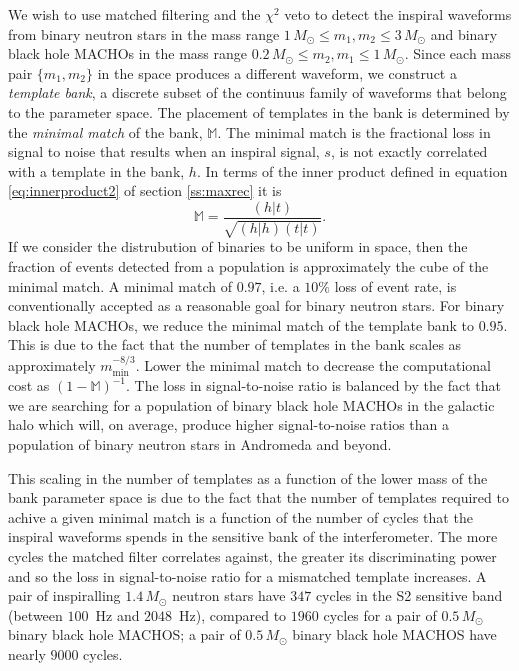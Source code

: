We wish to use matched filtering and the $\chi^2$ veto to detect the inspiral
waveforms from binary neutron stars in the mass range $1\,M_\odot\le m_1,
m_2\le 3\,M_\odot$ and binary black hole MACHOs in the mass range
$0.2\,M_\odot\le m_2, m_1\le 1\,M_\odot$. Since each mass pair $\{m_1,m_2\}$
in the space produces a different waveform, we construct a {\em template
bank}, a discrete subset of the continuus family of waveforms that belong to
the parameter space. The placement of templates in the bank is determined by
the \emph{minimal match} of the bank, $\mathbb{M}$. The minimal match is the
fractional loss in signal to noise that results when an inspiral signal, $s$,
is not exactly correlated with a template in the bank, $h$. In terms of the
inner product defined in equation \ref{eq:innerproduct2} of section
\ref{ss:maxrec} it is
\begin{equation}
\mathbb{M} = \frac{(h|t)} {\sqrt{(h|h)(t|t)}}.
\end{equation}
If we consider the distrubution of binaries to be uniform in space, then the
fraction of events detected from a population is approximately the cube of the
minimal match. A minimal match of $0.97$, i.e. a $10\%$ loss of event rate, is
conventionally accepted as a reasonable goal for binary neutron stars. For
binary black hole MACHOs, we reduce the minimal match of the template bank to
$0.95$. This is due to the fact that the number of templates in the bank
scales as approximately $m_\mathrm{min}^{-8/3}$. Lower the minimal match to
decrease the computational cost as $(1 - \mathbb{M})^{-1}$. The
loss in signal-to-noise ratio is balanced by the fact that we are searching
for a population of binary black hole MACHOs in the galactic halo which will,
on average, produce higher signal-to-noise ratios than a population of binary
neutron stars in Andromeda and beyond.

This scaling in the number of templates as a function of the lower mass of the
bank parameter space is due to the fact that the number of templates required
to achive a given minimal match is a function of the number of cycles that the
inspiral waveforms spends in the sensitive bank of the interferometer. The
more cycles the matched filter correlates against, the greater its
discriminating power and so the loss in signal-to-noise ratio for a mismatched
template increases. A pair of inspiralling $1.4\,M_\odot$ neutron stars have
$347$ cycles in the S2 sensitive band (between $100$~Hz and $2048$~Hz),
compared to $1960$ cycles for a pair of $0.5\,M_\odot$ binary black hole
MACHOS; a pair of $0.5\,M_\odot$ binary black hole MACHOS have nearly $9000$
cycles.

